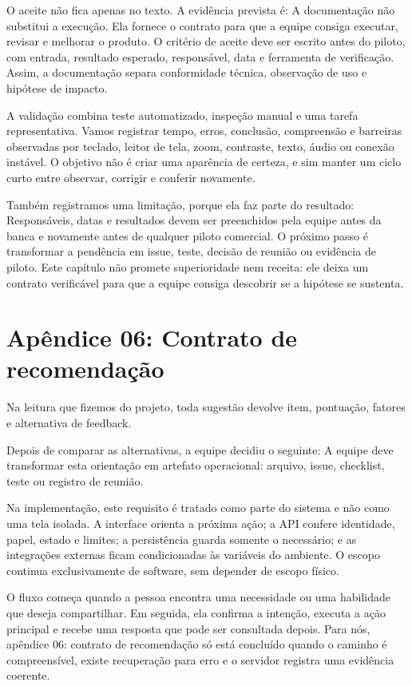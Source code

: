 \documentclass[12pt,oneside,a4paper,article]{abntex2}
\begin{document}
O aceite não fica apenas no texto. A evidência prevista é: A documentação não substitui a execução. Ela fornece o contrato para que a equipe consiga executar, revisar e melhorar o produto. O critério de aceite deve ser escrito antes do piloto, com entrada, resultado esperado, responsável, data e ferramenta de verificação. Assim, a documentação separa conformidade técnica, observação de uso e hipótese de impacto.

A validação combina teste automatizado, inspeção manual e uma tarefa representativa. Vamos registrar tempo, erros, conclusão, compreensão e barreiras observadas por teclado, leitor de tela, zoom, contraste, texto, áudio ou conexão instável. O objetivo não é criar uma aparência de certeza, e sim manter um ciclo curto entre observar, corrigir e conferir novamente.

Também registramos uma limitação, porque ela faz parte do resultado: Responsáveis, datas e resultados devem ser preenchidos pela equipe antes da banca e novamente antes de qualquer piloto comercial. O próximo passo é transformar a pendência em issue, teste, decisão de reunião ou evidência de piloto. Este capítulo não promete superioridade nem receita: ele deixa um contrato verificável para que a equipe consiga descobrir se a hipótese se sustenta.

\section{Apêndice 06: Contrato de recomendação}
Na leitura que fizemos do projeto, toda sugestão devolve item, pontuação, fatores e alternativa de feedback.

Depois de comparar as alternativas, a equipe decidiu o seguinte: A equipe deve transformar esta orientação em artefato operacional: arquivo, issue, checklist, teste ou registro de reunião.

Na implementação, este requisito é tratado como parte do sistema e não como uma tela isolada. A interface orienta a próxima ação; a API confere identidade, papel, estado e limites; a persistência guarda somente o necessário; e as integrações externas ficam condicionadas às variáveis do ambiente. O escopo continua exclusivamente de software, sem depender de escopo físico.

O fluxo começa quando a pessoa encontra uma necessidade ou uma habilidade que deseja compartilhar. Em seguida, ela confirma a intenção, executa a ação principal e recebe uma resposta que pode ser consultada depois. Para nós, apêndice 06: contrato de recomendação só está concluído quando o caminho é compreensível, existe recuperação para erro e o servidor registra uma evidência coerente.
\end{document}
